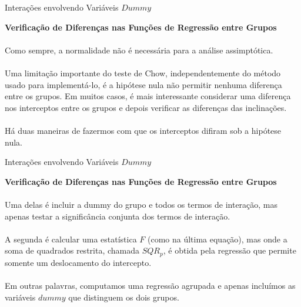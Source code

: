 \documentclass[t,14pt,mathserif]{beamer}
\begin{document}
{
\begin{frame}{Interações envolvendo Variáveis $Dummy$}
		\begin{tcolorbox}
			\indent\textbf{\small{Verificação de Diferenças nas Funções de Regressão entre Grupos}}\\ 
			\\ \footnotesize{Como sempre, a normalidade não é necessária para a análise assimptótica.}\\
		\\ \footnotesize{Uma limitação importante do teste de Chow, independentemente do método usado para implementá-lo, é a hipótese nula não permitir nenhuma diferença entre os grupos. Em muitos casos, é mais interessante considerar uma diferença nos interceptos entre os grupos e depois verificar as diferenças das inclinações}.\\
	    \\ \footnotesize{Há duas maneiras de fazermos com que os interceptos difiram sob a hipótese nula}.\\
	  
		\end{tcolorbox}
       
\end{frame}
}  
{
\begin{frame}{Interações envolvendo Variáveis $Dummy$}
		\begin{tcolorbox}
			\indent\textbf{\small{Verificação de Diferenças nas Funções de Regressão entre Grupos}}\\ 
		 \\\footnotesize{Uma delas é incluir a dummy do grupo e todos os termos de interação, mas apenas testar a significância conjunta dos termos de interação.}\\	
		\\ \footnotesize{ A segunda é calcular uma estatística $F$ (como na última equação), mas onde a soma de quadrados restrita, chamada $SQR_p$, é obtida pela regressão que permite somente um deslocamento do intercepto}.\\
	    \\ \footnotesize{Em outras palavras, computamos uma regressão agrupada e apenas incluímos as variáveis $dummy$ que distinguem os dois grupos.}\\
		\end{tcolorbox}
       
\end{frame}
}  
\end{document}
